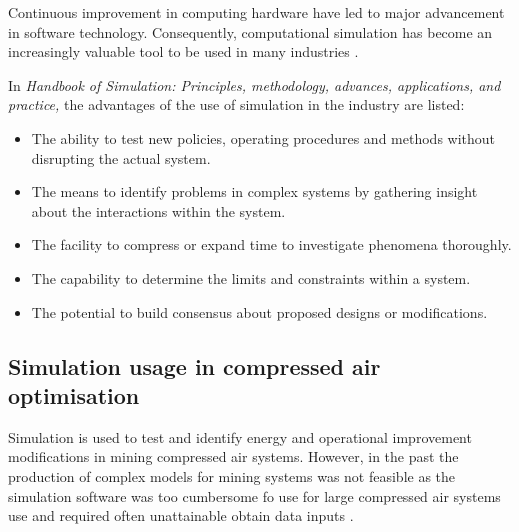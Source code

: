 		Continuous improvement in computing hardware have led to major advancement in software technology. Consequently, computational simulation has become an increasingly valuable tool to be used in many industries \cite{kocsis2003integration}.
		\par 
		In \textit{ Handbook of Simulation: Principles, methodology, advances, applications, and practice,} \cite{banks1998handbook} the advantages of the use of simulation in the industry are listed: %
		\begin{itemize}
			\item The ability to test new policies, operating procedures and methods without disrupting the actual system.
			\item The means to identify problems in complex systems by gathering insight about the interactions within the system.
			\item The facility to compress or expand time to investigate phenomena thoroughly.
			\item The capability to determine the limits and constraints within a system.
			\item The potential to build consensus about proposed designs or modifications.
		\end{itemize}

	\subsection{Simulation usage in compressed air optimisation}
		Simulation is used to test and identify energy and operational improvement modifications in mining compressed air systems. However, in the past  the production of complex models for mining systems was not feasible as the simulation software was too cumbersome fo use for large compressed air systems use and required often unattainable obtain data inputs \cite{marais2013simplification}. 
		\par 
